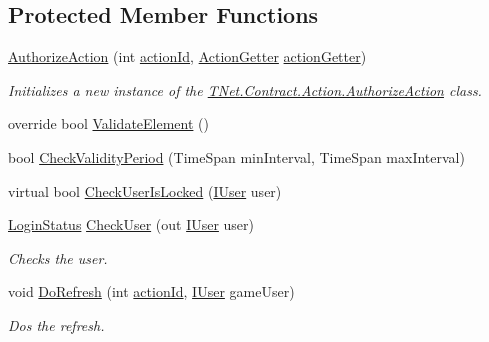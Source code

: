 \subsection*{Protected Member Functions}
\begin{DoxyCompactItemize}
\item 
\mbox{\hyperlink{class_t_net_1_1_contract_1_1_action_1_1_authorize_action_ab04a11cc2032cab9ce1145baa9abbad8}{Authorize\+Action}} (int \mbox{\hyperlink{class_t_net_1_1_service_1_1_game_struct_a8c3c761a891a0da9d72d17d34a0f7446}{action\+Id}}, \mbox{\hyperlink{class_t_net_1_1_service_1_1_action_getter}{Action\+Getter}} \mbox{\hyperlink{class_t_net_1_1_service_1_1_game_struct_a14dcf224eb5a73e2c0b3bee4fe359dd8}{action\+Getter}})
\begin{DoxyCompactList}\small\item\em Initializes a new instance of the \mbox{\hyperlink{class_t_net_1_1_contract_1_1_action_1_1_authorize_action}{T\+Net.\+Contract.\+Action.\+Authorize\+Action}} class. \end{DoxyCompactList}\item 
override bool \mbox{\hyperlink{class_t_net_1_1_contract_1_1_action_1_1_authorize_action_a71b0f279c0f6f2d32d371388a2fa0947}{Validate\+Element}} ()
\item 
bool \mbox{\hyperlink{class_t_net_1_1_contract_1_1_action_1_1_authorize_action_ac74f37a7a4d61b947685906ac606ff0e}{Check\+Validity\+Period}} (Time\+Span min\+Interval, Time\+Span max\+Interval)
\item 
virtual bool \mbox{\hyperlink{class_t_net_1_1_contract_1_1_action_1_1_authorize_action_a4c2e19926211024dd9f2cf2ec32af57e}{Check\+User\+Is\+Locked}} (\mbox{\hyperlink{interface_t_net_1_1_context___1_1_i_user}{I\+User}} user)
\item 
\mbox{\hyperlink{namespace_t_net_1_1_service_a6aea7ec0b2c4f3e53963bbcb309a1dea}{Login\+Status}} \mbox{\hyperlink{class_t_net_1_1_contract_1_1_action_1_1_authorize_action_a2567869e51116af31c0ee0c51ce616fc}{Check\+User}} (out \mbox{\hyperlink{interface_t_net_1_1_context___1_1_i_user}{I\+User}} user)
\begin{DoxyCompactList}\small\item\em Checks the user. \end{DoxyCompactList}\item 
void \mbox{\hyperlink{class_t_net_1_1_contract_1_1_action_1_1_authorize_action_ab23b91a9451baf629cd5e18be072628b}{Do\+Refresh}} (int \mbox{\hyperlink{class_t_net_1_1_service_1_1_game_struct_a8c3c761a891a0da9d72d17d34a0f7446}{action\+Id}}, \mbox{\hyperlink{interface_t_net_1_1_context___1_1_i_user}{I\+User}} game\+User)
\begin{DoxyCompactList}\small\item\em Dos the refresh. \end{DoxyCompactList}\end{DoxyCompactItemize}
